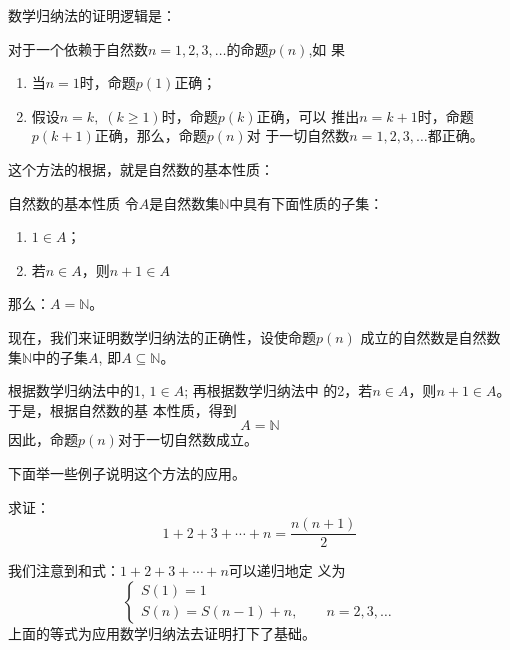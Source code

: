 数学归纳法的证明逻辑是：

对于一个依赖于自然数$n=1,2,3,\ldots$的命题$p(n)$,如
果
\begin{enumerate}
    \item 当$n=1$时，命题$p(1)$正确；
    \item 假设$n=k,\; (k\ge 1)$时，命题$p(k)$正确，可以
推出$n=k+1$时，命题$p(k+1)$正确，那么，命题$p(n)$对
于一切自然数$n=1,2,3,\ldots$都正确。
\end{enumerate}

这个方法的根据，就是自然数的基本性质：

\begin{blk}{自然数的基本性质}
    令$A$是自然数集$\mathbb{N}$中具有下面性质的子集：
\begin{enumerate}
    \item $1\in A$；
    \item 若$n\in A$，则$n+1\in A$
\end{enumerate}
那么：$A=\mathbb{N}$。
\end{blk}

现在，我们来证明数学归纳法的正确性，设使命题$p(n)$
成立的自然数是自然数集$\mathbb{N}$中的子集$A$, 即$A\subseteq \mathbb{N}$。

根据数学归纳法中的1, $1\in A$; 再根据数学归纳法中
的2，若$n\in A$，则$n+1\in A$。于是，根据自然数的基
本性质，得到
$$A=\mathbb{N}$$
因此，命题$p(n)$对于一切自然数成立。

下面举一些例子说明这个方法的应用。

\begin{example}
    求证：
    \begin{equation}
        1+2+3+\cdots+n=\frac{n(n+1)}{2}
    \end{equation}
\end{example}

\begin{analyze}
    我们注意到和式：$ 1+2+3+\cdots+n$可以递归地定
义为
\[\begin{cases}
    S(1)=1\\
    S(n)=S(n-1)+n,\qquad n=2,3,\ldots
\end{cases}\]
上面的等式为应用数学归纳法去证明打下了基础。
\end{analyze}

